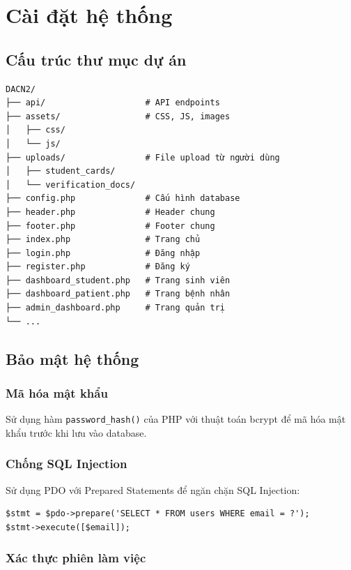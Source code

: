\documentclass[12pt,a4paper]{report}
\begin{document}
\section{Cài đặt hệ thống}

\subsection{Cấu trúc thư mục dự án}

\begin{verbatim}
DACN2/
├── api/                    # API endpoints
├── assets/                 # CSS, JS, images
│   ├── css/
│   └── js/
├── uploads/                # File upload từ người dùng
│   ├── student_cards/
│   └── verification_docs/
├── config.php              # Cấu hình database
├── header.php              # Header chung
├── footer.php              # Footer chung
├── index.php               # Trang chủ
├── login.php               # Đăng nhập
├── register.php            # Đăng ký
├── dashboard_student.php   # Trang sinh viên
├── dashboard_patient.php   # Trang bệnh nhân
├── admin_dashboard.php     # Trang quản trị
└── ...
\end{verbatim}

\subsection{Bảo mật hệ thống}

\subsubsection{Mã hóa mật khẩu}

Sử dụng hàm \texttt{password\_hash()} của PHP với thuật toán bcrypt để mã hóa mật khẩu trước khi lưu vào database.

\subsubsection{Chống SQL Injection}

Sử dụng PDO với Prepared Statements để ngăn chặn SQL Injection:

\begin{verbatim}
$stmt = $pdo->prepare('SELECT * FROM users WHERE email = ?');
$stmt->execute([$email]);
\end{verbatim}

\subsubsection{Xác thực phiên làm việc}
\end{document}

